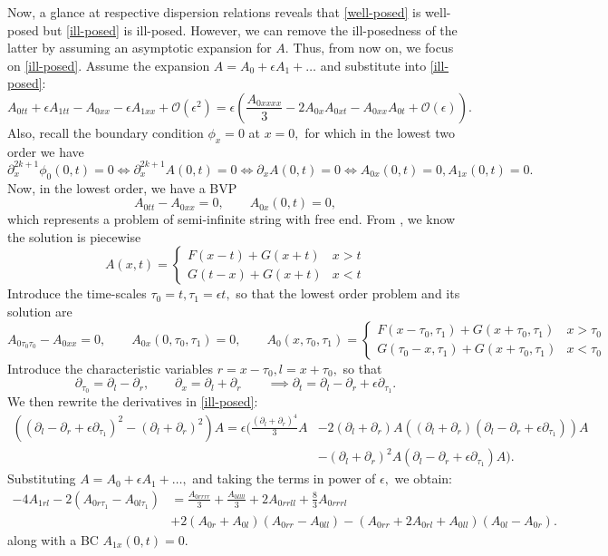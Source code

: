 \documentclass[10pt,reqno,oneside,a4paper]{article}
\begin{document}
Now, a glance at respective dispersion relations reveals that \eqref{well-posed} is well-posed but \eqref{ill-posed} is ill-posed. However, we can remove the ill-posedness of the latter by assuming an asymptotic expansion for $A.$ Thus, from now on, we focus on \eqref{ill-posed}. Assume the expansion $A= A_0 + \epsilon A_1 + \ldots$ and substitute into \eqref{ill-posed}:
\[  
A_{0tt} + \epsilon A_{1tt} - A_{0xx}  - \epsilon A_{1xx} + \mathcal{O}(\epsilon^2) = \epsilon \left( \frac{A_{0xxxx}}{3} - 2 A_{0x}A_{0xt} - A_{0xx}A_{0t} + \mathcal{O}(\epsilon)\right).
\]
Also, recall the boundary condition $\phi_x = 0$ at $x = 0,$ for which in the lowest two order we have 
\[ 
\partial_x^{2k+1}\phi_0(0,t) = 0 \iff \partial_x^{2k+1}A(0,t) = 0 \iff \partial_xA(0,t) = 0 \iff  A_{0x}(0,t) = 0, A_{1x}(0,t) = 0.
\]
Now, in the lowest order, we have a BVP
\[ 
A_{0tt} - A_{0xx} = 0, \qquad A_{0x}(0,t) = 0,
\]
which represents a problem of semi-infinite string with free end. From \cite[Chapter 9, p.64-65]{knobel}, we know the solution is piecewise
\[ 
A(x,t) = \begin{cases} F(x-t) +G(x + t) & x>t  \\ G(t- x) + G(x+t) & x<t \end{cases}
\]
Introduce the time-scales $\tau_0 = t, \tau_1 = \epsilon t,$ so that the lowest order problem and its solution are
\[ 
A_{0\tau_0\tau_0} - A_{0xx} = 0, \qquad A_{0x}(0,\tau_0, \tau_1) = 0, \qquad A_0(x,\tau_0, \tau_1) = \begin{cases} F(x-\tau_0, \tau_1) +G(x + \tau_0, \tau_1) & x>\tau_0  \\ G(\tau_0- x, \tau_1) + G(x+\tau_0, \tau_1) & x<\tau_0 \end{cases}
\] 
Introduce the characteristic variables $r =x - \tau_0, l = x + \tau_0,$ so that
\[ 
\partial_{\tau_0} = \partial_l - \partial_r, \qquad \partial_x = \partial_l + \partial_r \qquad \implies \partial_{t} = \partial_l - \partial_r + \epsilon \partial_{\tau_1}. 
\]
We then rewrite the derivatives in \eqref{ill-posed}:
\begin{align*}
\left( (\partial_l - \partial_r + \epsilon \partial_{\tau_1})^2 - (\partial_l + \partial_r)^2 \right)A = \epsilon \bigg(\frac{(\partial_l + \partial_r)^4}{3}A &- 2(\partial_l + \partial_r)A ((\partial_l + \partial_r)(\partial_l - \partial_r + \epsilon \partial_{\tau_1}))A \\
&- (\partial_l + \partial_r)^2 A (\partial_l - \partial_r + \epsilon \partial_{\tau_1})A \bigg).
\end{align*}
Substituting  $A =  A_0 + \epsilon A_1 + \ldots,$ and taking the terms in power of $\epsilon,$ we obtain:
\begin{equation}\label{a1}
\begin{aligned}
-4A_{1rl} - 2(A_{0 r\tau_{1}} - A_{0l\tau_1}) &= \frac{A_{0rrrr}}{3} + \frac{A_{0llll}}{3} + 2A_{0rrll} +\frac{8}{3}A_{0rrrl} \\
&+ 2(A_{0r} +  A_{0l})(A_{0rr} - A_{0ll}) - (A_{0rr} + 2A_{0rl} + A_{0ll})(A_{0l} - A_{0r}). 
\end{aligned}
\end{equation}
along with a BC $A_{1x}(0,t) = 0.$ 
\end{document}
